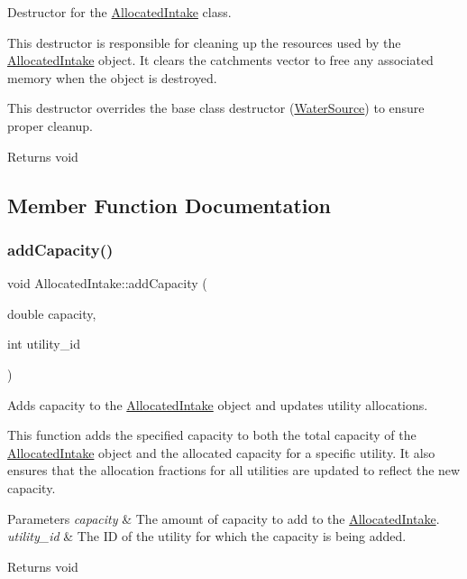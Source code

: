 Destructor for the {\ttfamily \mbox{\hyperlink{classAllocatedIntake}{Allocated\+Intake}}} class. 

This destructor is responsible for cleaning up the resources used by the {\ttfamily \mbox{\hyperlink{classAllocatedIntake}{Allocated\+Intake}}} object. It clears the {\ttfamily catchments} vector to free any associated memory when the object is destroyed.

This destructor overrides the base class destructor ({\ttfamily \mbox{\hyperlink{classWaterSource}{Water\+Source}}}) to ensure proper cleanup.

\begin{DoxyReturn}{Returns}
void 
\end{DoxyReturn}


\subsection{Member Function Documentation}
\mbox{\label{classAllocatedIntake_a32a52eb269d4de861cc844633eceefb0}} 
\subsubsection{\texorpdfstring{add\+Capacity()}{addCapacity()}}
{\footnotesize\ttfamily void Allocated\+Intake\+::add\+Capacity (\begin{DoxyParamCaption}\item[{double}]{capacity,  }\item[{int}]{utility\+\_\+id }\end{DoxyParamCaption})\hspace{0.3cm}{\ttfamily [virtual]}}



Adds capacity to the {\ttfamily \mbox{\hyperlink{classAllocatedIntake}{Allocated\+Intake}}} object and updates utility allocations. 

This function adds the specified capacity to both the total capacity of the {\ttfamily \mbox{\hyperlink{classAllocatedIntake}{Allocated\+Intake}}} object and the allocated capacity for a specific utility. It also ensures that the allocation fractions for all utilities are updated to reflect the new capacity.


\begin{DoxyParams}{Parameters}
{\em capacity} & The amount of capacity to add to the {\ttfamily \mbox{\hyperlink{classAllocatedIntake}{Allocated\+Intake}}}. \\
\hline
{\em utility\+\_\+id} & The ID of the utility for which the capacity is being added.\\
\hline
\end{DoxyParams}
\begin{DoxyReturn}{Returns}
void 
\end{DoxyReturn}



